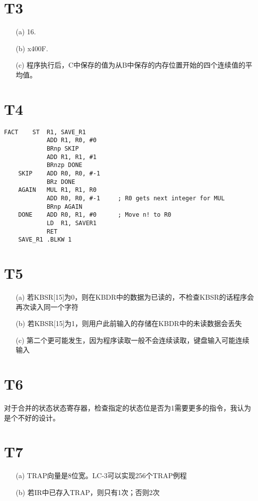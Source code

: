 \documentclass{article}
\begin{document}
\section*{T3}
\begin{enumerate}
    \item [(a)]16.
    \item [(b)]x400F.
    \item [(c)]程序执行后，C中保存的值为从B中保存的内存位置开始的四个连续值的平均值。
\end{enumerate}



\section*{T4}
\begin{lstlisting}[basicstyle=\ttfamily,language={[x86masm]Assembler}]
    FACT	ST  R1, SAVE_R1
            ADD R1, R0, #0
            BRnp SKIP
            ADD R1, R1, #1
            BRnzp DONE
    SKIP	ADD R0, R0, #-1
            BRz DONE
    AGAIN	MUL R1, R1, R0
            ADD R0, R0, #-1     ; R0 gets next integer for MUL
            BRnp AGAIN
    DONE	ADD R0, R1, #0      ; Move n! to R0
            LD  R1, SAVER1
            RET
    SAVE_R1	.BLKW 1
\end{lstlisting}


\section*{T5}
\begin{enumerate}
    \item [(a)]若KBSR[15]为0，则在KBDR中的数据为已读的，不检查KBSR的话程序会再次读入同一个字符
    \item [(b)]若KBSR[15]为1，则用户此前输入的存储在KBDR中的未读数据会丢失
    \item [(c)]第二个更可能发生，因为程序读取一般不会连续读取，键盘输入可能连续输入
\end{enumerate}


\section*{T6}
对于合并的状态状态寄存器，检查指定的状态位是否为1需要更多的指令，我认为是个不好的设计。


\section*{T7}
\begin{enumerate}
    \item [(a)]TRAP向量是8位宽。LC-3可以实现256个TRAP例程
    \item [(b)]若IR中已存入TRAP，则只有1次；否则2次
\end{enumerate}
\end{document}
